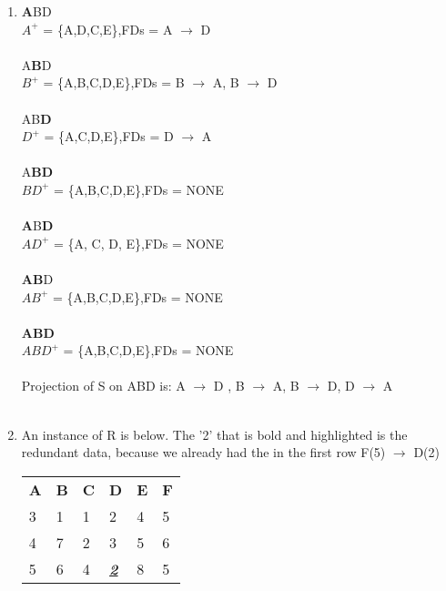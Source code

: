 \documentclass{article}
\begin{document}
\begin{enumerate}
    \item %
       \textbf{A}BD \\
        $A^{+}$ = \{A,D,C,E\},\quad \quad FDs = A $\rightarrow$ D 
       	\\ \\ 
       	A\textbf{B}D \\
        $B^{+}$ = \{A,B,C,D,E\},\quad \quad FDs = B $\rightarrow$ A, B $\rightarrow$ D
       	\\ \\ 
       	AB\textbf{D} \\
        $D^{+}$ = \{A,C,D,E\},\quad \quad FDs = D $\rightarrow$ A 
       	\\ \\ 
       	A\textbf{BD} \\
        $BD^{+}$ = \{A,B,C,D,E\},\quad \quad FDs = NONE
       	\\ \\ 
       	\textbf{A}B\textbf{D} \\
        $AD^{+}$ = \{A, C, D, E\},\quad \quad FDs = NONE
       	\\ \\ 
       	\textbf{AB}D \\
        $AB^{+}$ = \{A,B,C,D,E\},\quad \quad FDs = NONE
       	\\ \\ 
       	\textbf{ABD} \\
        $ABD^{+}$ = \{A,B,C,D,E\},\quad \quad FDs = NONE
       	\\ \\ 
       	
       	Projection of S on ABD is: A $\rightarrow$ D , B $\rightarrow$ A, B $\rightarrow$ D, D $\rightarrow$ A \\ \\
       	
       	
    \item %
    		
    		An instance of R is below. The '2' that is bold and highlighted is the redundant data, because we already had the in the first row F(5) $\rightarrow$ D(2)
    		
    		\begin{table}[h!]
				\begin{tabular}{llllll}
 					\textbf{A} & \textbf{B} & \textbf{C} & \textbf{D} & \textbf{E} & \textbf{F}\\
						3 & 1 & 1 & 2                                                 & 4 & 5 \\
						4 & 7 & 2 & 3                                                 & 5 & 6 \\
						5 & 6 & 4 & {\ul \textit{\textbf{2}}} & 8 & 5
				\end{tabular}
				\end{table}
    
    
        
\end{enumerate}

		
\end{document}
